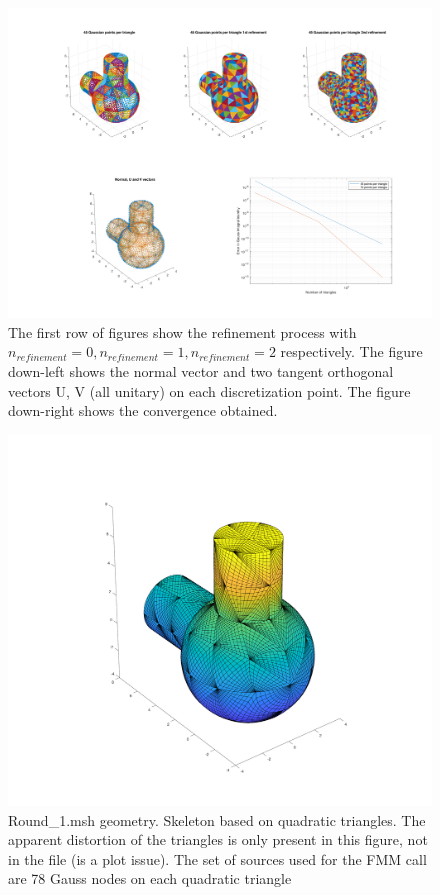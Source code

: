 \documentclass[11pt, oneside]{article}   	%
\begin{document}
\begin{figure}[H]
\begin{center}
\includegraphics[width=6in]{Round_1.pdf}
\end{center}
\caption{The first row of figures show the refinement process with $n_{refinement}=0, n_{refinement}=1, n_{refinement}=2$ respectively.
The figure down-left shows the normal vector and two tangent orthogonal vectors U, V (all unitary) on each discretization point. The figure down-right shows the convergence obtained.}
\label{Round_1}
\end{figure}


\begin{figure}[H]
\begin{center}
\includegraphics[width=6in]{Round_1_skeleton.pdf}
\end{center}
\caption{Round\_1.msh geometry. Skeleton based on quadratic triangles. The apparent distortion of the triangles is only present in this figure, not in the file (is a plot issue). The set of sources used for the FMM call are 78 Gauss nodes on each quadratic triangle}
\label{Round_1_skeleton}
\end{figure}
\end{document}
